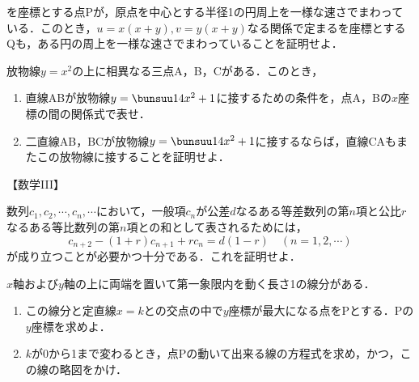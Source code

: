 \begin{problem}
  を座標とする点Pが，原点を中心とする半径1の円周上を一様な速さでまわっている．このとき，$u = x(x+y), v = y(x+y)$なる関係で定まるを座標とするQも，ある円の周上を一様な速さでまわっていることを証明せよ．
\end{problem}
\begin{problem}
  放物線$y=x^2$の上に相異なる三点A，B，Cがある．このとき，
  \begin{enumerate}
    \item 直線ABが放物線$y = \bunsuu14 x^2+ 1$に接するための条件を，点A，Bの$x$座標の間の関係式で表せ．
    \item 二直線AB，BCが放物線$y = \bunsuu14x^2 + 1$に接するならば，直線CAもまたこの放物線に接することを証明せよ．
  \end{enumerate}
\end{problem}


\begin{center}
  【数学III】
\end{center}
\begin{problem}
  数列$c_1,c_2,\cdots,c_n,\cdots$において，一般項$c_n$が公差$d$なるある等差数列の第$n$項と公比$r$なるある等比数列の第$n$項との和として表されるためには，
  \[c_{n+2} - (1+r)c_{n+1} + rc_n = d(1-r)\quad (n=1,2,\cdots)\]
  が成り立つことが必要かつ十分である．これを証明せよ．
\end{problem}
\begin{problem}
  $x$軸および$y$軸の上に両端を置いて第一象限内を動く長さ1の線分がある．
  \begin{enumerate}
    \item この線分と定直線$x=k$との交点の中で$y$座標が最大になる点をPとする．Pの$y$座標を求めよ．
    \item $k$が0から1まで変わるとき，点Pの動いて出来る線の方程式を求め，かつ，この線の略図をかけ．
  \end{enumerate}
\end{problem}
